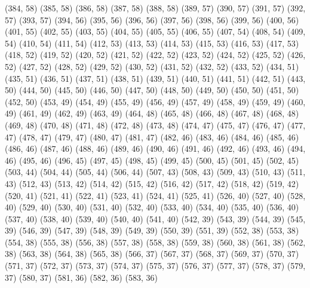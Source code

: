 {   (384, 58)
   (385, 58)
   (386, 58)
   (387, 58)
   (388, 58)
   (389, 57)
   (390, 57)
   (391, 57)
   (392, 57)
   (393, 57)
   (394, 56)
   (395, 56)
   (396, 56)
   (397, 56)
   (398, 56)
   (399, 56)
   (400, 56)
   (401, 55)
   (402, 55)
   (403, 55)
   (404, 55)
   (405, 55)
   (406, 55)
   (407, 54)
   (408, 54)
   (409, 54)
   (410, 54)
   (411, 54)
   (412, 53)
   (413, 53)
   (414, 53)
   (415, 53)
   (416, 53)
   (417, 53)
   (418, 52)
   (419, 52)
   (420, 52)
   (421, 52)
   (422, 52)
   (423, 52)
   (424, 52)
   (425, 52)
   (426, 52)
   (427, 52)
   (428, 52)
   (429, 52)
   (430, 52)
   (431, 52)
   (432, 52)
   (433, 52)
   (434, 51)
   (435, 51)
   (436, 51)
   (437, 51)
   (438, 51)
   (439, 51)
   (440, 51)
   (441, 51)
   (442, 51)
   (443, 50)
   (444, 50)
   (445, 50)
   (446, 50)
   (447, 50)
   (448, 50)
   (449, 50)
   (450, 50)
   (451, 50)
   (452, 50)
   (453, 49)
   (454, 49)
   (455, 49)
   (456, 49)
   (457, 49)
   (458, 49)
   (459, 49)
   (460, 49)
   (461, 49)
   (462, 49)
   (463, 49)
   (464, 48)
   (465, 48)
   (466, 48)
   (467, 48)
   (468, 48)
   (469, 48)
   (470, 48)
   (471, 48)
   (472, 48)
   (473, 48)
   (474, 47)
   (475, 47)
   (476, 47)
   (477, 47)
   (478, 47)
   (479, 47)
   (480, 47)
   (481, 47)
   (482, 46)
   (483, 46)
   (484, 46)
   (485, 46)
   (486, 46)
   (487, 46)
   (488, 46)
   (489, 46)
   (490, 46)
   (491, 46)
   (492, 46)
   (493, 46)
   (494, 46)
   (495, 46)
   (496, 45)
   (497, 45)
   (498, 45)
   (499, 45)
   (500, 45)
   (501, 45)
   (502, 45)
   (503, 44)
   (504, 44)
   (505, 44)
   (506, 44)
   (507, 43)
   (508, 43)
   (509, 43)
   (510, 43)
   (511, 43)
   (512, 43)
   (513, 42)
   (514, 42)
   (515, 42)
   (516, 42)
   (517, 42)
   (518, 42)
   (519, 42)
   (520, 41)
   (521, 41)
   (522, 41)
   (523, 41)
   (524, 41)
   (525, 41)
   (526, 40)
   (527, 40)
   (528, 40)
   (529, 40)
   (530, 40)
   (531, 40)
   (532, 40)
   (533, 40)
   (534, 40)
   (535, 40)
   (536, 40)
   (537, 40)
   (538, 40)
   (539, 40)
   (540, 40)
   (541, 40)
   (542, 39)
   (543, 39)
   (544, 39)
   (545, 39)
   (546, 39)
   (547, 39)
   (548, 39)
   (549, 39)
   (550, 39)
   (551, 39)
   (552, 38)
   (553, 38)
   (554, 38)
   (555, 38)
   (556, 38)
   (557, 38)
   (558, 38)
   (559, 38)
   (560, 38)
   (561, 38)
   (562, 38)
   (563, 38)
   (564, 38)
   (565, 38)
   (566, 37)
   (567, 37)
   (568, 37)
   (569, 37)
   (570, 37)
   (571, 37)
   (572, 37)
   (573, 37)
   (574, 37)
   (575, 37)
   (576, 37)
   (577, 37)
   (578, 37)
   (579, 37)
   (580, 37)
   (581, 36)
   (582, 36)
   (583, 36)
}

